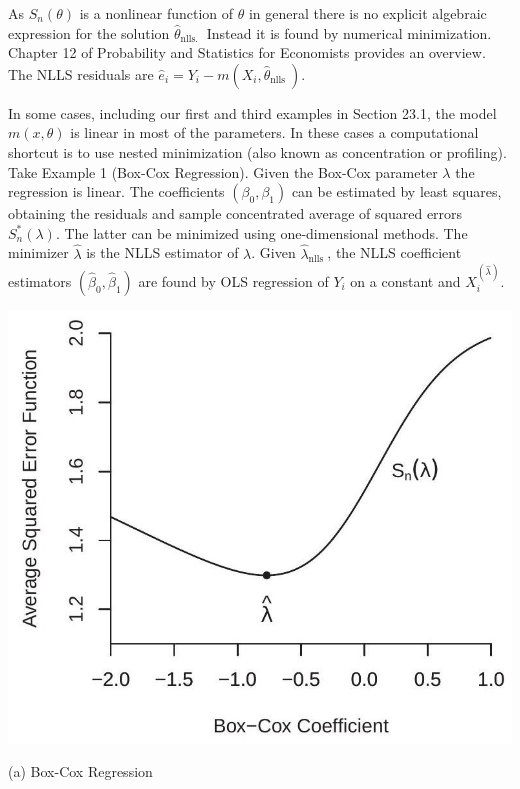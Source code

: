 \documentclass[10pt]{article}
\begin{document}
As $S_{n}(\theta)$ is a nonlinear function of $\theta$ in general there is no explicit algebraic expression for the solution $\widehat{\theta}_{\text {nlls. }}$ Instead it is found by numerical minimization. Chapter 12 of Probability and Statistics for Economists provides an overview. The NLLS residuals are $\widehat{e}_{i}=Y_{i}-m\left(X_{i}, \widehat{\theta}_{\text {nlls }}\right)$.

In some cases, including our first and third examples in Section 23.1, the model $m(x, \theta)$ is linear in most of the parameters. In these cases a computational shortcut is to use nested minimization (also known as concentration or profiling). Take Example 1 (Box-Cox Regression). Given the Box-Cox parameter $\lambda$ the regression is linear. The coefficients $\left(\beta_{0}, \beta_{1}\right)$ can be estimated by least squares, obtaining the residuals and sample concentrated average of squared errors $S_{n}^{*}(\lambda)$. The latter can be minimized using one-dimensional methods. The minimizer $\hat{\lambda}$ is the NLLS estimator of $\lambda$. Given $\hat{\lambda}_{\text {nlls }}$, the NLLS coefficient estimators $\left(\widehat{\beta}_{0}, \widehat{\beta}_{1}\right)$ are found by OLS regression of $Y_{i}$ on a constant and $X_{i}^{(\widehat{\lambda})}$.

\includegraphics[max width=\textwidth]{2022_10_23_afe6a5896d8677a5cd30g-04}

(a) Box-Cox Regression
\end{document}
